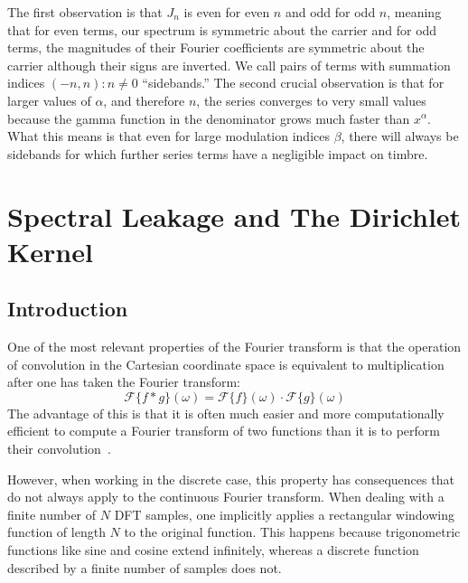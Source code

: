 \documentclass[11pt,twoside]{report}
\numberwithin{thm}{section}
\numberwithin{equation}{section}
\begin{document}
The first observation is that $J_n$ is even for even $n$ and odd for odd $n$, meaning that for even terms, our spectrum is symmetric about the carrier and for odd terms, the magnitudes of their Fourier coefficients are symmetric about the carrier although their signs are inverted. We call pairs of terms with summation indices $(-n,n) :n\neq 0$ ``sidebands.'' The second crucial observation is that for larger values of $\alpha$, and therefore $n$, the series converges to very small values because the gamma function in the denominator grows much faster than $x^\alpha$. What this means is that even for large modulation indices $\beta$, there will always be sidebands for which further series terms have a negligible impact on timbre. 
  
\chapter{Spectral Leakage and The Dirichlet Kernel}
\label{ch:3}
\section{Introduction}\label{sec:leakage}
One of the most relevant properties of the Fourier transform is that the operation of convolution in the Cartesian coordinate space is equivalent to multiplication after one has taken the Fourier transform:
\begin{equation}\label{eq:conv}
\mathcal{F}\{f \ast g\}(\omega) = \mathcal{F}\{f\}(\omega) \cdot \mathcal{F}\{g\}(\omega)
\end{equation}
The advantage of this is that it is often much easier and more computationally efficient to compute a Fourier transform of two functions than it is to perform their convolution~\cite{David13}.

However, when working in the discrete case, this property has consequences that do not always apply to the continuous Fourier transform. When dealing with a finite number of $N$ DFT samples, one implicitly applies a rectangular windowing function of length $N$ to the original function. This happens because trigonometric functions like sine and cosine extend infinitely, whereas a discrete function described by a finite number of samples does not.
\end{document}
